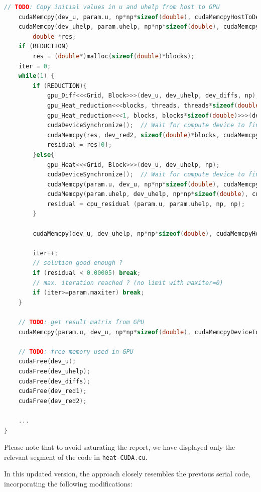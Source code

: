 \documentclass[titlepage]{article}
\newcommand{\incode}[1]{\lstinline[style=inlineC,language=C]{#1}}
\begin{document}
\begin{lstlisting}[style=c, language=C, caption=Modified heat-CUDA.c, captionpos=b]
    // TODO: Copy initial values in u and uhelp from host to GPU
    cudaMemcpy(dev_u, param.u, np*np*sizeof(double), cudaMemcpyHostToDevice);
    cudaMemcpy(dev_uhelp, param.uhelp, np*np*sizeof(double), cudaMemcpyHostToDevice);
        double *res;
    if (REDUCTION)
        res = (double*)malloc(sizeof(double)*blocks);
    iter = 0;
    while(1) {
        if (REDUCTION){
            gpu_Diff<<<Grid, Block>>>(dev_u, dev_uhelp, dev_diffs, np);
            gpu_Heat_reduction<<<blocks, threads, threads*sizeof(double)>>>(dev_diffs, dev_red1, (np-2) * (np-2));
            gpu_Heat_reduction<<<1, blocks, blocks*sizeof(double)>>>(dev_red1, dev_red2, blocks);
            cudaDeviceSynchronize();  // Wait for compute device to finish.
            cudaMemcpy(res, dev_red2, sizeof(double)*blocks, cudaMemcpyDeviceToHost);
            residual = res[0];
        }else{
            gpu_Heat<<<Grid, Block>>>(dev_u, dev_uhelp, np);
            cudaDeviceSynchronize();  // Wait for compute device to finish.
            cudaMemcpy(param.u, dev_u, np*np*sizeof(double), cudaMemcpyDeviceToHost);
            cudaMemcpy(param.uhelp, dev_uhelp, np*np*sizeof(double), cudaMemcpyDeviceToHost);
            residual = cpu_residual (param.u, param.uhelp, np, np);
        }

        cudaMemcpy(dev_u, dev_uhelp, np*np*sizeof(double), cudaMemcpyHostToHost);

        iter++;
        // solution good enough ?
        if (residual < 0.00005) break;
        // max. iteration reached ? (no limit with maxiter=0)
        if (iter>=param.maxiter) break;
    }

    // TODO: get result matrix from GPU
    cudaMemcpy(param.u, dev_u, np*np*sizeof(double), cudaMemcpyDeviceToHost);

    // TODO: free memory used in GPU
    cudaFree(dev_u);
    cudaFree(dev_uhelp);
    cudaFree(dev_diffs);
    cudaFree(dev_red1);
    cudaFree(dev_red2);
    
    ...
}
\end{lstlisting}

Please note that to avoid saturating the report, we have displayed only the relevant segment of the code in \incode{heat-CUDA.cu}. 

In this updated version, the approach closely resembles the previous serial code, incorporating the following modifications:
\end{document}

